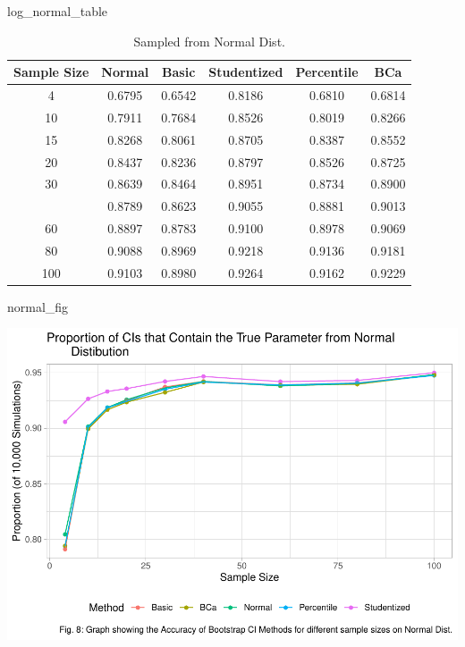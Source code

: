 \documentclass[12pt]{article}
\newenvironment{Shaded}{\begin{snugshade}}{\end{snugshade}}
\newcommand{\NormalTok}[1]{#1}
\begin{document}
\begin{Shaded}
\begin{Highlighting}[]
\NormalTok{log\_normal\_table}
\end{Highlighting}
\end{Shaded}

\begin{table}

\caption{\label{tab:create graphs}Sampled from Normal Dist.}
\centering
\begin{tabular}[t]{cccccc}
\toprule
Sample Size & Normal & Basic & Studentized & Percentile & BCa\\
\midrule
4 & 0.6795 & 0.6542 & 0.8186 & 0.6810 & 0.6814\\
10 & 0.7911 & 0.7684 & 0.8526 & 0.8019 & 0.8266\\
15 & 0.8268 & 0.8061 & 0.8705 & 0.8387 & 0.8552\\
20 & 0.8437 & 0.8236 & 0.8797 & 0.8526 & 0.8725\\
30 & 0.8639 & 0.8464 & 0.8951 & 0.8734 & 0.8900\\
\addlinespace
40 & 0.8789 & 0.8623 & 0.9055 & 0.8881 & 0.9013\\
60 & 0.8897 & 0.8783 & 0.9100 & 0.8978 & 0.9069\\
80 & 0.9088 & 0.8969 & 0.9218 & 0.9136 & 0.9181\\
100 & 0.9103 & 0.8980 & 0.9264 & 0.9162 & 0.9229\\
\bottomrule
\end{tabular}
\end{table}

\begin{Shaded}
\begin{Highlighting}[]
\NormalTok{normal\_fig}
\end{Highlighting}
\end{Shaded}

\includegraphics{paper_files/figure-latex/unnamed-chunk-24-2.pdf}
\end{document}
